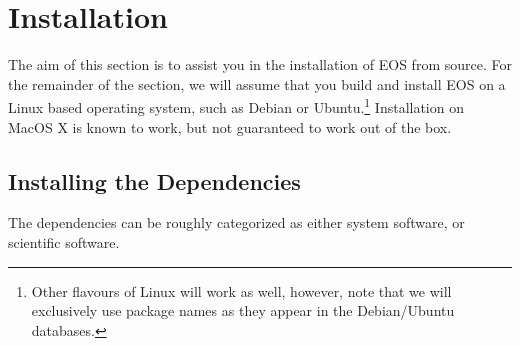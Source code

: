 \chapter{Installation}

The aim of this section is to assist you in the installation of EOS
from source. For the remainder of the section, we will assume that you
build and install EOS on a Linux based operating system, such as Debian
or Ubuntu.\footnote{%
    Other flavours of Linux will work as well, however, note that
    we will exclusively use package names as they appear in the Debian/Ubuntu
     databases.
}
Installation on MacOS X is known to work, but not guaranteed to work out
of the box.

\section{Installing the Dependencies}

The dependencies can be roughly categorized as either system software, or
scientific software.

